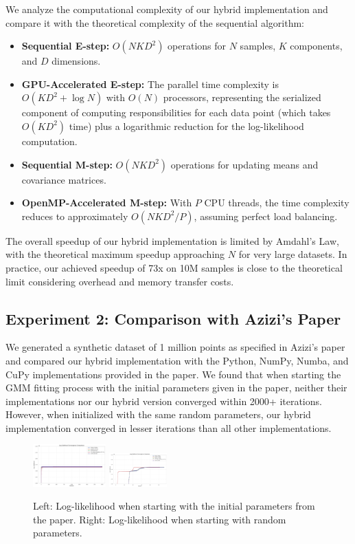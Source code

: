 \documentclass[conference]{IEEEtran}
\begin{document}
We analyze the computational complexity of our hybrid implementation and compare it with the theoretical complexity of the sequential algorithm:

\begin{itemize}
    \item \textbf{Sequential E-step:} $O(NKD^2)$ operations for $N$ samples, $K$ components, and $D$ dimensions.
    
    \item \textbf{GPU-Accelerated E-step:} The parallel time complexity is $O(KD^2 + \log N)$ with $O(N)$ processors, representing the serialized component of computing responsibilities for each data point (which takes $O(KD^2)$ time) plus a logarithmic reduction for the log-likelihood computation.
    
    \item \textbf{Sequential M-step:} $O(NKD^2)$ operations for updating means and covariance matrices.
    
    \item \textbf{OpenMP-Accelerated M-step:} With $P$ CPU threads, the time complexity reduces to approximately $O(NKD^2/P)$, assuming perfect load balancing.
\end{itemize}

The overall speedup of our hybrid implementation is limited by Amdahl's Law, with the theoretical maximum speedup approaching $N$ for very large datasets. In practice, our achieved speedup of 73x on 10M samples is close to the theoretical limit considering overhead and memory transfer costs.

\subsection{Experiment 2: Comparison with Azizi's Paper}
We generated a synthetic dataset of 1 million points as specified in Azizi's paper and compared our hybrid implementation with the Python, NumPy, Numba, and CuPy implementations provided in the paper. We found that when starting the GMM fitting process with the initial parameters given in the paper, neither their implementations nor our hybrid version converged within 2000+ iterations. However, when initialized with the same random parameters, our hybrid implementation converged in lesser iterations than all other implementations.

\begin{figure}[h!]
    \centering
    \includegraphics[width=0.25\textwidth]{azizi1.png}
    \includegraphics[width=0.2\textwidth]{azizi2.png}
    \caption{Left: Log-likelihood when starting with the initial parameters from the paper. Right: Log-likelihood when starting with random parameters.}
\end{figure}
\end{document}
